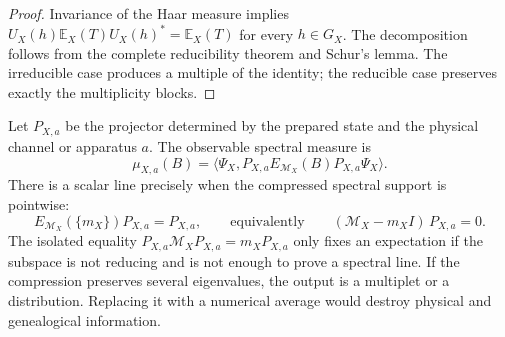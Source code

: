 \begin{proof}
Invariance of the Haar measure implies
\(U_X(h)\mathbb E_X(T)U_X(h)^*=\mathbb E_X(T)\) for every \(h\in G_X\).
The decomposition follows from the complete reducibility theorem and Schur's
lemma. The irreducible case produces a multiple of the identity; the
reducible case preserves exactly the multiplicity blocks.
\end{proof}

Let \(P_{X,a}\) be the projector determined by the prepared state and the physical channel or
apparatus \(a\). The observable spectral measure is
\[
 \mu_{X,a}(B)=
 \langle\Psi_X,
 P_{X,a}E_{\mathcal M_X}(B)P_{X,a}\Psi_X\rangle.
\]
There is a scalar line precisely when the compressed spectral support is
pointwise:
\[
 E_{\mathcal M_X}(\{m_X\})P_{X,a}=P_{X,a},
 \qquad\text{equivalently}\qquad
 (\mathcal M_X-m_X I)\,P_{X,a}=0.
\]
The isolated equality
\(P_{X,a}\mathcal M_X P_{X,a}=m_X P_{X,a}\) only fixes an expectation if the
subspace is not reducing and is not enough to prove a spectral line.
If the compression preserves several eigenvalues, the output is a multiplet or a
distribution. Replacing it with a numerical average would destroy physical
and genealogical information.


